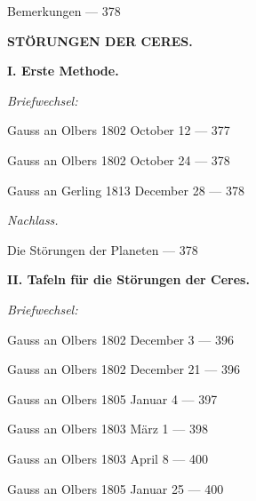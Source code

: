 \documentclass[10pt,a4paper]{article}
\newenvironment{hangparas}[2]{\setlength{\hangindent}{#1}\setlength{\hangafter}{#2}}{}
\begin{document}
\noindent Bemerkungen \hfill --- 378

\vspace{1em}

\begin{center}
\textbf{STÖRUNGEN DER CERES.}
\end{center}

\vspace{0.3em}

\noindent\textbf{I. Erste Methode.}

\vspace{0.2em}

\noindent\textit{Briefwechsel:}

\vspace{0.2em}

\begin{hangparas}{1em}{1}
\noindent Gauss an Olbers 1802 October 12 \hfill --- 377

\noindent Gauss an Olbers 1802 October 24 \hfill --- 378

\noindent Gauss an Gerling 1813 December 28 \hfill --- 378
\end{hangparas}

\vspace{0.2em}

\noindent\textit{Nachlass.}

\vspace{0.2em}

\begin{hangparas}{1em}{1}
\noindent Die Störungen der Planeten \hfill --- 378
\end{hangparas}

\vspace{0.3em}

\noindent\textbf{II. Tafeln für die Störungen der Ceres.}

\vspace{0.2em}

\noindent\textit{Briefwechsel:}

\vspace{0.2em}

\begin{hangparas}{1em}{1}
\noindent Gauss an Olbers 1802 December 3 \hfill --- 396

\noindent Gauss an Olbers 1802 December 21 \hfill --- 396

\noindent Gauss an Olbers 1805 Januar 4 \hfill --- 397

\noindent Gauss an Olbers 1803 März 1 \hfill --- 398

\noindent Gauss an Olbers 1803 April 8 \hfill --- 400

\noindent Gauss an Olbers 1805 Januar 25 \hfill --- 400
\end{hangparas}
\end{document}
